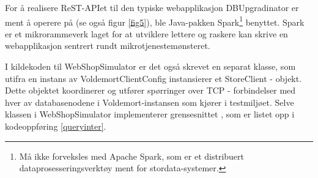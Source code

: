 For å realisere ReST-APIet til den typiske webapplikasjon DBUpgradinator er ment å operere på (se også figur \ref{fig5}), ble Java-pakken Spark\footnote{Må ikke forveksles med Apache Spark, som er et distribuert dataprosesseringsverktøy ment for stordata-systemer.} benyttet. Spark er et mikro\-rammeverk laget for at utviklere lettere og raskere kan skrive en webapplikasjon sentrert rundt mikrotjeneste\-mønsteret.

I kildekoden til WebShopSimulator er det også skrevet en separat klasse, som utifra en instans av VoldemortClientConfig instansierer et StoreClient - objekt. Dette objektet koordinerer og utfører spørringer over TCP - forbindelser med hver av databasenodene i Voldemort-instansen som kjører i testmiljøet. Selve klassen i WebShopSimulator implementerer grensesnittet , som er listet opp i kodeoppføring \ref{queryinter}.

